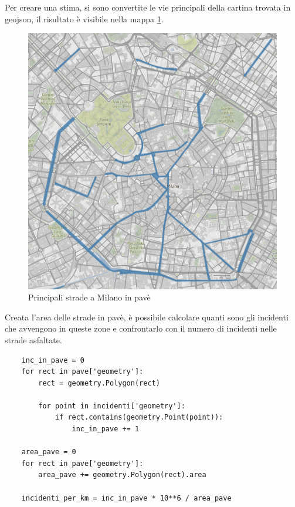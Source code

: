 \documentclass[a4paper]{report}
\begin{document}
Per creare una stima, si sono convertite le vie principali della cartina trovata 
in geojson, il risultato è visibile nella mappa \ref{fig:mappa-pave}.

\begin{figure}
    \includegraphics[width=\linewidth]{../src/pave/mappa_pave.png}
    \caption{Principali strade a Milano in pavè}
    \label{fig:mappa-pave}
\end{figure}

Creata l'area delle strade in pavè, è possibile calcolare quanti sono gli incidenti che 
avvengono in queste zone e confrontarlo con il numero di incidenti nelle strade asfaltate.

\begin{lstlisting}
    inc_in_pave = 0
    for rect in pave['geometry']: 
        rect = geometry.Polygon(rect)

        for point in incidenti['geometry']: 
            if rect.contains(geometry.Point(point)): 
                inc_in_pave += 1

    area_pave = 0
    for rect in pave['geometry']: 
        area_pave += geometry.Polygon(rect).area

    incidenti_per_km = inc_in_pave * 10**6 / area_pave
\end{lstlisting}
\end{document}
